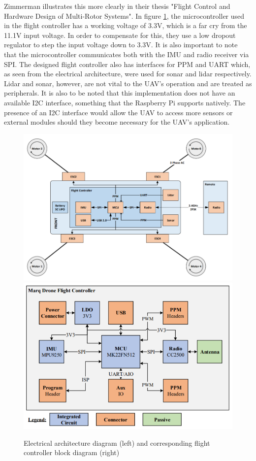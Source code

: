 \documentclass[english]{upeeei}
\begin{document}
Zimmerman illustrates this more clearly in their thesis "Flight Control and Hardware Design of Multi-Rotor Systems". In figure 
\ref{fig:detailed_quad_block_diagram}, the microcontroller used in the flight controller has a working voltage of 3.3V, which is a far cry
from the 11.1V input voltage. In order to compensate for this, they use a low dropout regulator to step the input voltage down to 3.3V. It
is also important to note that the microcontroller communicates both with the IMU and radio receiver via SPI. The designed flight controller
also has interfaces for PPM and UART which, as seen from the electrical architecture, were used for sonar and lidar respectively. Lidar and
sonar, however, are not vital to the UAV's operation and are treated as peripherals. It is also to be noted that this implementation does
not have an available I2C interface, something that the Raspberry Pi supports natively. The presence of an I2C interface would allow the
UAV to access more sensors or external modules should they become necessary for the UAV's application.
\begin{figure}[h]
    \centering
    \includegraphics[scale=0.45]{images/zimmerman_high_level.PNG}
    \includegraphics[scale=0.45]{images/fc_block_diagram_detailed.PNG}
    \caption{Electrical architecture diagram (left) and corresponding flight controller block diagram (right)\cite{zimmerman2016}}
    \label{fig:detailed_quad_block_diagram}
\end{figure}
\end{document}
